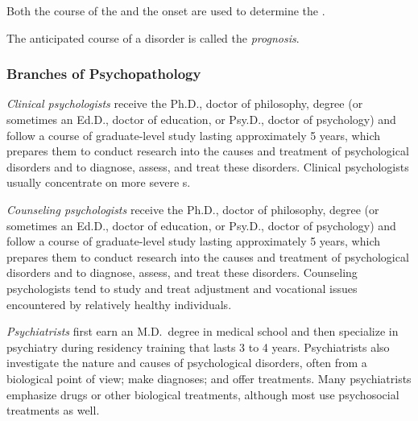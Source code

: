 Both the course of the  and the onset are used to determine the .

\begin{definition}[Prognosis]\label{def:Prognosis}
  The anticipated course of a disorder is called the \emph{prognosis}.
\end{definition}

\subsubsection{Branches of Psychopathology}\label{subsubsec:Psychopathology_Branches}
\begin{definition}\label{def:Clinical_Psychologist}
  \emph{Clinical psychologists} receive the Ph.D., doctor of philosophy, degree (or sometimes an Ed.D., doctor of education, or Psy.D., doctor of psychology) and follow a course of graduate-level study lasting approximately 5 years, which prepares them to conduct research into the causes and treatment of psychological disorders and to diagnose, assess, and treat these disorders.
  Clinical psychologists usually concentrate on more severe s.
\end{definition}

\begin{definition}\label{def:Counseling_Psychologist}
  \emph{Counseling psychologists} receive the Ph.D., doctor of philosophy, degree (or sometimes an Ed.D., doctor of education, or Psy.D., doctor of psychology) and follow a course of graduate-level study lasting approximately 5 years, which prepares them to conduct research into the causes and treatment of psychological disorders and to diagnose, assess, and treat these disorders.
  Counseling psychologists tend to study and treat adjustment and vocational issues encountered by relatively healthy individuals.
\end{definition}

\begin{definition}[Psychiatrist]\label{def:Psychiatrist}
  \emph{Psychiatrists} first earn an M.D.\ degree in medical school and then specialize in psychiatry during residency training that lasts 3 to 4 years.
  Psychiatrists also investigate the nature and causes of psychological disorders, often from a biological point of view; make diagnoses; and offer treatments.
  Many psychiatrists emphasize drugs or other biological treatments, although most use psychosocial treatments as well.
\end{definition}

